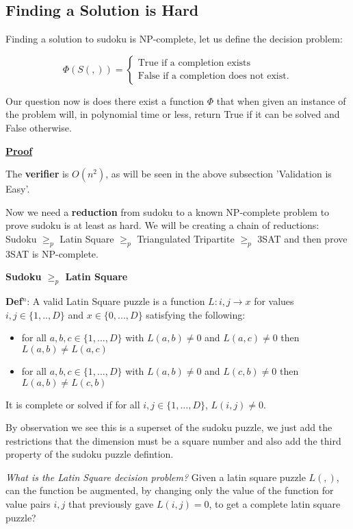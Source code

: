 \documentclass[a4paper,12pt]{article}
\begin{document}
	\subsection{Finding a Solution is Hard}
		
Finding a solution to sudoku is NP-complete, let us define the decision problem:

		\begin{equation}
		        \Phi (S(,)) = \begin{cases}
		            \text{True if a completion exists} \\
		            \text{False if a completion does not exist}.
				\end{cases}
		\end{equation}

Our question now is does there exist a function $\Phi$ that when given an instance of the problem will, in polynomial time or less, return True if it can be solved and False otherwise.

\textbf{\underline{Proof}}

The \textbf{verifier} is $O(n^2)$, as will be seen in the above subsection 'Validation is Easy'.

Now we need a \textbf{reduction} from sudoku to a known NP-complete problem to prove sudoku is at least as hard. We will be creating a chain of reductions: Sudoku $\geq_p$  Latin Square $\geq_p$  Triangulated Tripartite $\geq_p$  3SAT and then prove 3SAT is NP-complete.

\textbf{Sudoku $\geq_p$ Latin Square}

\textbf{Def$^n$}: A valid Latin Square puzzle is a function $L:i,j \rightarrow x$ for values $i,j \in \{1,..,D\} $ and $x \in \{0,...,D\}$ satisfying the following:
\begin{itemize}
\item{for all $a,b,c \in \{1,...,D\}$ with $L(a,b) \neq 0 $ and $L(a,c) \neq 0$ then $L(a,b) \neq L(a,c)$}
\item{for all $a,b,c \in \{1,...,D\}$ with $L(a,b) \neq 0 $ and $L(c,b) \neq 0$ then $L(a,b) \neq L(c,b)$}
\end{itemize}
It is complete or solved if for all $i,j \in \{1,...,D\}$, $L(i,j) \neq 0$.

By observation we see this is a superset of the sudoku puzzle, we just add the restrictions that the dimension must be a square number and also add the third property of the sudoku puzzle defintion.

\textit{What is the Latin Square decision problem?} Given a latin square puzzle $L(,)$, can the function be augmented, by changing only the value of the function for value pairs $i,j$ that previously gave $L(i,j) =0$, to get a complete latin square puzzle?
\end{document}
